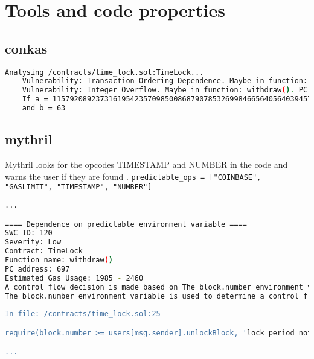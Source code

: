 \section{Tools and code properties}

\subsection{conkas}
\begin{lstlisting}[language=bash, caption="conkas output for the time lock contract"]
    Analysing /contracts/time_lock.sol:TimeLock...
    Vulnerability: Transaction Ordering Dependence. Maybe in function: withdraw(). PC: 0x3b9. Line number: 29.
    Vulnerability: Integer Overflow. Maybe in function: withdraw(). PC: 0x3d3. Line number: .
    If a = 115792089237316195423570985008687907853269984665640564039457584007913129639920
    and b = 63
\end{lstlisting}

\subsection{mythril}
Mythril looks for the opcodes TIMESTAMP and NUMBER in the code and warns the user if they are found \cite{mythril_opcodes}. \newline
\verb|predictable_ops = ["COINBASE", "GASLIMIT", "TIMESTAMP", "NUMBER"]|

\begin{lstlisting}[language=bash, caption="Mythril output for the time lock contract"]
...

==== Dependence on predictable environment variable ====
SWC ID: 120
Severity: Low
Contract: TimeLock
Function name: withdraw()
PC address: 697
Estimated Gas Usage: 1985 - 2460
A control flow decision is made based on The block.number environment variable.
The block.number environment variable is used to determine a control flow decision. Note that the values of variables like coinbase, gaslimit, block number and timestamp are predictable and can be manipulated by a malicious miner. Also keep in mind that attackers know hashes of earlier blocks. Don't use any of those environment variables as sources of randomness and be aware that use of these variables introduces a certain level of trust into miners.
--------------------
In file: /contracts/time_lock.sol:25

require(block.number >= users[msg.sender].unlockBlock, 'lock period not over')

...
\end{lstlisting}